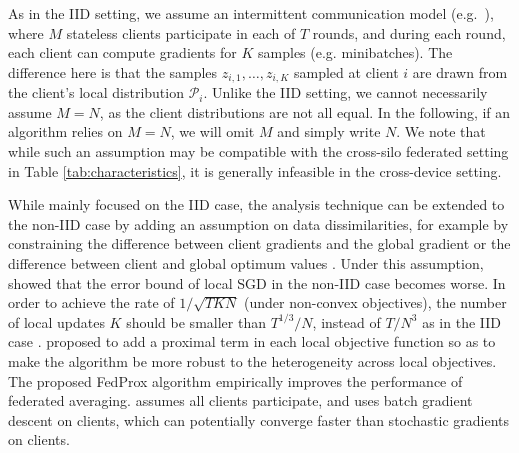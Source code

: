 \documentclass[11pt]{article}
\newcommand{\sketch}[1]{[{\color{darkgreen}{\emph{#1}}}]}
\begin{document}
As in the IID setting, we assume an intermittent communication model (e.g.\ \citet[Sec. 4.4]{woodworth18graphoracle}), where $M$ stateless clients participate in each of $T$ rounds, and during each round, each client can compute gradients for $K$ samples (e.g. minibatches). The difference here is that the samples $z_{i, 1}, \ldots, z_{i, K}$ sampled at client $i$ are drawn from the client's local distribution $\mathcal{P}_i$. Unlike the IID setting, we cannot necessarily assume $M = N$, as the client distributions are not all equal. In the following, if an algorithm relies on $M = N$, we will omit $M$ and simply write $N$. We note that while such an assumption may be compatible with the cross-silo federated setting in Table \ref{tab:characteristics}, it is generally infeasible in the cross-device setting.

While \citep{stich2018local,yu2018parallel,wang2018cooperative,stich2019error} mainly focused on the IID case, the analysis technique can be extended to the non-IID case by adding an assumption on data dissimilarities, for example by constraining the difference between client gradients and the global gradient \citep{Lian2017b,li2018federated,li2019communication,wang2019matcha,wang2020tackling} or the difference between client and global optimum values \citep{li2019convergence,khaled2019analysis}. Under this assumption, \citet{yu2019linear} showed that the error bound of local SGD in the non-IID case becomes worse. In order to achieve the rate of $1/\sqrt{TKN}$ (under non-convex objectives), the number of local updates $K$ should be smaller than $T^{1/3}/N$, instead of $T/N^3$
as in the IID case \cite{wang2018cooperative}. \citet{li2018federated} proposed to add a proximal term in each local objective function so as to make the algorithm be more robust to the heterogeneity across local objectives. The proposed FedProx algorithm empirically improves the performance of federated averaging. 
\citet{khaled2019analysis}  assumes all clients participate, and uses batch gradient descent on clients, which can potentially converge faster than stochastic gradients on clients.  
\end{document}

